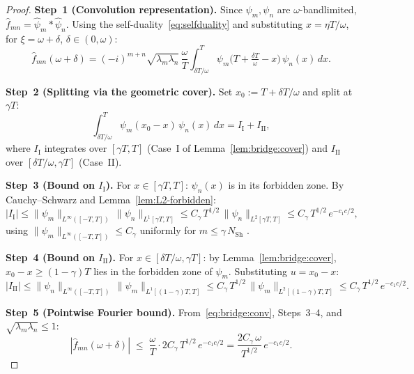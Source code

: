 \documentclass[12pt,a4paper]{article}
\theoremstyle{definition}
\newcommand{\NSh}{N_{\mathrm{Sh}}}
\begin{document}
\begin{proof}
\textbf{Step~1 (Convolution representation).}
Since $\psi_m, \psi_n$ are $\omega$-bandlimited,
$\widehat{f}_{mn} = \widehat\psi_m * \widehat\psi_n$.
Using the self-duality~\eqref{eq:selfduality} and
substituting $x = \eta T/\omega$, for
$\xi = \omega+\delta$, $\delta \in (0,\omega)$:
\begin{equation}
\label{eq:bridge:conv}
  \widehat{f}_{mn}(\omega+\delta)
  = (-i)^{m+n}\sqrt{\lambda_m\lambda_n}\,
    \frac{\omega}{T}
    \int_{\delta T/\omega}^{T}
    \psi_m\!\bigl(T + \tfrac{\delta T}{\omega} - x\bigr)\,
    \psi_n(x)\,dx.
\end{equation}

\textbf{Step~2 (Splitting via the geometric cover).}
Set $x_0 := T + \delta T/\omega$ and split at $\gamma T$:
\[
  \int_{\delta T/\omega}^{T}
  \psi_m(x_0-x)\,\psi_n(x)\,dx
  = I_{\mathrm{I}} + I_{\mathrm{II}},
\]
where $I_{\mathrm{I}}$ integrates over $[\gamma T, T]$
(Case~I of Lemma~\ref{lem:bridge:cover}) and
$I_{\mathrm{II}}$ over $[\delta T/\omega, \gamma T]$
(Case~II).

\textbf{Step~3 (Bound on $I_{\mathrm{I}}$).}
For $x \in [\gamma T, T]$: $\psi_n(x)$ is in its
forbidden zone. By Cauchy--Schwarz and
Lemma~\ref{lem:L2-forbidden}:
\begin{equation}
\label{eq:bridge:I1}
  |I_{\mathrm{I}}|
  \le \|\psi_m\|_{L^\infty([-T,T])}\,
     \|\psi_n\|_{L^1[\gamma T,T]}
  \le C_\gamma\,T^{1/2}\,
     \|\psi_n\|_{L^2[\gamma T,T]}
  \le C_\gamma\,T^{1/2}\,e^{-c_1 c/2},
\end{equation}
using $\|\psi_m\|_{L^\infty([-T,T])} \le C_\gamma$
uniformly for $m \le \gamma\,\NSh$
\cite[Corollary~4.3]{OsipovRokhlinXiao}.

\textbf{Step~4 (Bound on $I_{\mathrm{II}}$).}
For $x \in [\delta T/\omega, \gamma T]$: by
Lemma~\ref{lem:bridge:cover}, $x_0 - x \ge (1-\gamma)T$
lies in the forbidden zone of $\psi_m$.
Substituting $u = x_0 - x$:
\begin{equation}
\label{eq:bridge:I2}
  |I_{\mathrm{II}}|
  \le \|\psi_n\|_{L^\infty([-T,T])}\,
     \|\psi_m\|_{L^1[(1-\gamma)T,T]}
  \le C_\gamma\,T^{1/2}\,
     \|\psi_m\|_{L^2[(1-\gamma)T,T]}
  \le C_\gamma\,T^{1/2}\,e^{-c_1 c/2}.
\end{equation}

\textbf{Step~5 (Pointwise Fourier bound).}
From~\eqref{eq:bridge:conv}, Steps~3--4, and
$\sqrt{\lambda_m\lambda_n} \le 1$:
\begin{equation}
\label{eq:bridge:pointwise}
  |\widehat{f}_{mn}(\omega+\delta)|
  \;\le\;
  \frac{\omega}{T}\cdot 2C_\gamma\,T^{1/2}\,e^{-c_1 c/2}
  = \frac{2C_\gamma\,\omega}{T^{1/2}}\,e^{-c_1 c/2}.
\end{equation}


\end{proof}
\end{document}
